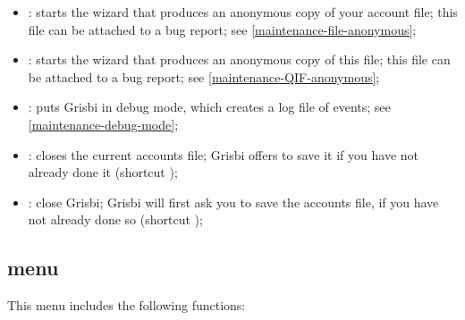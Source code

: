 \begin{itemize}
	\item {}: starts the wizard that produces an anonymous copy of your account file; this file can be attached to a bug report; see \vref{maintenance-file-anonymous};%
	\item {}: starts the wizard that produces an anonymous copy of this file; this file can be attached to a bug report; see \vref{maintenance-QIF-anonymous};%
	\item {}: puts Grisbi in debug mode, which creates a log file of events; see \vref{maintenance-debug-mode};%
	\item {}: closes the current accounts file; Grisbi offers to save it if you have not already done it (shortcut );%
	\item {}: close Grisbi; Grisbi will first ask you to save the accounts file, if you have not already done so (shortcut );%
\end{itemize}


\subsection{ menu\label{home-menus-edit}}

This menu includes the following functions:

